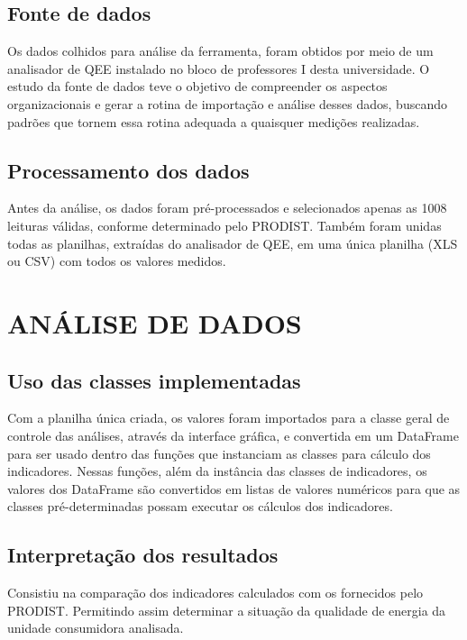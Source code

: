 \subsection{Fonte de dados}

Os dados colhidos para análise da ferramenta, foram obtidos por meio de um analisador de QEE instalado no bloco de professores I desta universidade. O estudo da fonte de dados teve o objetivo de compreender os aspectos organizacionais e gerar a rotina de importação e análise desses dados, buscando padrões que tornem essa rotina adequada a quaisquer medições realizadas.

\subsection{Processamento dos dados}

Antes da análise, os dados foram pré-processados e selecionados apenas as 1008 leituras válidas, conforme determinado pelo PRODIST. Também foram unidas todas as planilhas, extraídas do analisador de QEE, em uma única planilha (XLS ou CSV) com todos os valores medidos.

\section{ANÁLISE DE DADOS}

\subsection{Uso das classes implementadas}

Com a planilha única criada, os valores foram importados para a classe geral de controle das análises, através da interface gráfica, e convertida em um DataFrame para ser usado dentro das funções que instanciam as classes para cálculo dos indicadores. Nessas funções, além da instância das classes de indicadores, os valores dos DataFrame são convertidos em listas de valores numéricos para que as classes pré-determinadas possam executar os cálculos dos indicadores.

\subsection{Interpretação dos resultados}

Consistiu na comparação dos indicadores calculados com os fornecidos pelo PRODIST. Permitindo assim determinar a situação da qualidade de energia da unidade consumidora analisada.

